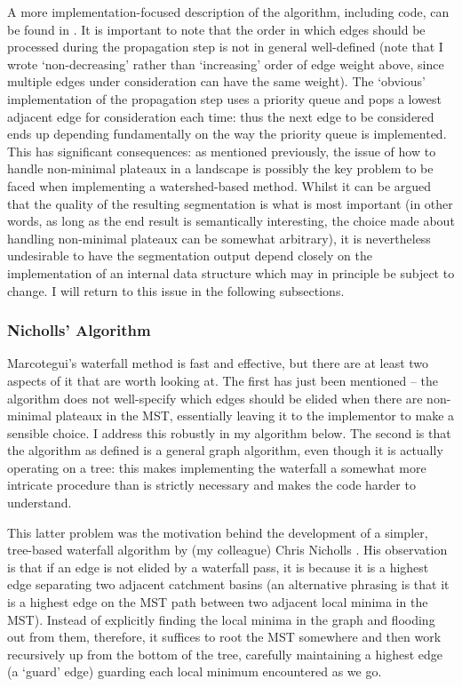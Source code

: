 A more implementation-focused description of the algorithm, including code, can be found in \cite{golodetz08}. It is important to note that the order in which edges should be processed during the propagation step is not in general well-defined (note that I wrote `non-decreasing' rather than `increasing' order of edge weight above, since multiple edges under consideration can have the same weight). The `obvious' implementation of the propagation step uses a priority queue and pops a lowest adjacent edge for consideration each time: thus the next edge to be considered ends up depending fundamentally on the way the priority queue is implemented. This has significant consequences: as mentioned previously, the issue of how to handle non-minimal plateaux in a landscape is possibly the key problem to be faced when implementing a watershed-based method. Whilst it can be argued that the quality of the resulting segmentation is what is most important (in other words, as long as the end result is semantically interesting, the choice made about handling non-minimal plateaux can be somewhat arbitrary), it is nevertheless undesirable to have the segmentation output depend closely on the implementation of an internal data structure which may in principle be subject to change. I will return to this issue in the following subsections.

\subsubsection{Nicholls' Algorithm}

Marcotegui's waterfall method is fast and effective, but there are at least two aspects of it that are worth looking at. The first has just been mentioned -- the algorithm does not well-specify which edges should be elided when there are non-minimal plateaux in the MST, essentially leaving it to the implementor to make a sensible choice. I address this robustly in my algorithm below. The second is that the algorithm as defined is a general graph algorithm, even though it is actually operating on a tree: this makes implementing the waterfall a somewhat more intricate procedure than is strictly necessary and makes the code harder to understand.

This latter problem was the motivation behind the development of a simpler, tree-based waterfall algorithm by (my colleague) Chris Nicholls \cite{nicholls09}. His observation is that if an edge is not elided by a waterfall pass, it is because it is a highest edge separating two adjacent catchment basins (an alternative phrasing is that it is a highest edge on the MST path between two adjacent local minima in the MST). Instead of explicitly finding the local minima in the graph and flooding out from them, therefore, it suffices to root the MST somewhere and then work recursively up from the bottom of the tree, carefully maintaining a highest edge (a `guard' edge) guarding each local minimum encountered as we go.

